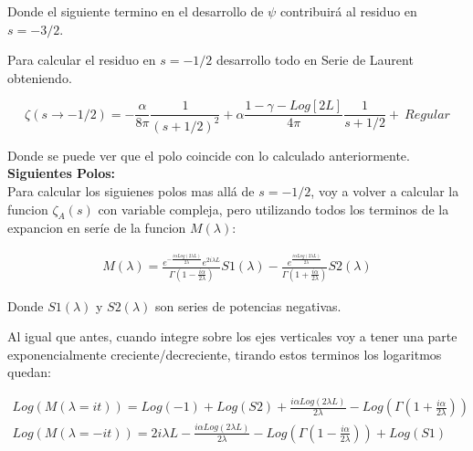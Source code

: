 Donde el siguiente termino en el desarrollo de $ \psi $ contribuirá al residuo en $s = -3/2$.

Para calcular el residuo en $s=-1/2$ desarrollo todo en Serie de Laurent obteniendo.

\begin{equation}
	\zeta (s \rightarrow -1/2) = 
    - \frac{\alpha}{8 \pi} \frac{1}{(s+1/2)^2} + 
    \alpha \frac{1-\gamma -Log[2 L]}{4 \pi} \frac{1}{s+1/2} + \ Regular
\label{eq.desarrollo}
\end{equation}

Donde se puede ver que el polo coincide con lo calculado anteriormente. \\


\textbf{Siguientes Polos:} \\

Para calcular los siguienes polos mas allá de $s=-1/2$, voy a volver a calcular la funcion $\zeta _A (s) $ con variable compleja, pero utilizando todos los terminos de la expancion en seríe de la funcion $M ( \lambda )$:

\begin{equation}
\begin{array}{c}
M( \lambda ) = 
 \frac{e ^{ - \frac{i \alpha Log \left( 2 \lambda L \right) }{2 \lambda } } e ^{2 i \lambda L } }
      { \Gamma \left( 1 - \frac{i \alpha}{2 \lambda}  \right) } S1 ( \lambda ) - 
 \frac{ e ^{   \frac{i \alpha Log \left(2 \lambda L \right) } 
           {2 \lambda } } }
      { \Gamma \left( 1 + \frac{i \alpha}{2 \lambda}  \right)   } S2 ( \lambda )
\end{array}
\end{equation}

Donde $S1 (\lambda ) $ y $S2 (\lambda)$ son series de potencias negativas. 

Al igual que antes, cuando integre sobre los ejes verticales voy a tener una parte exponencialmente creciente/decreciente, tirando estos terminos los logaritmos quedan:

\begin{equation}
\begin{array}{c}

Log ( M ( \lambda = i t ) ) = Log( -1) + Log(S2) + 
\frac{i \alpha Log(2 \lambda L)}{2 \lambda} - Log( \Gamma( 1 + \frac{i \alpha}{2 \lambda} ) ) \\

Log( M ( \lambda = -i t ) ) = 2 i \lambda L - \frac{i \alpha Log( 2 \lambda L )}{2 \lambda} - 
Log( \Gamma ( 1 - \frac{i \alpha}{2 \lambda} )) + Log(S1)

\end{array}
\end{equation}

